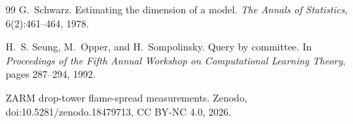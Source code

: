 \documentclass[11pt,twocolumn]{article}
\begin{document}
\begin{thebibliography}{99}
G.~Schwarz.
\newblock Estimating the dimension of a model.
\newblock \emph{The Annals of Statistics}, 6(2):461--464, 1978.

H.~S. Seung, M.~Opper, and H.~Sompolinsky.
\newblock Query by committee.
\newblock In \emph{Proceedings of the Fifth Annual Workshop on Computational Learning Theory}, pages
287--294, 1992.

ZARM drop-tower flame-spread measurements.
\newblock Zenodo, doi:10.5281/zenodo.18479713, CC BY-NC 4.0, 2026.

\end{thebibliography}
\end{document}

